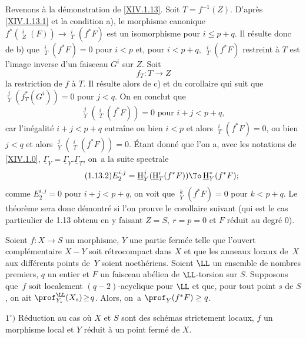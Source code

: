 Revenons \`a la d\'emonstration de \ref{XIV.1.13}. Soit $T=f^{-1}(Z)$. D'apr\`es \ref{XIV.1.13.1} et la condition a), le morphisme canonique $f^*(\mathop{\underline{\mathrm{H}}}\nolimits_Z^i(F))\to\mathop{\underline{\mathrm{H}}}\nolimits_T^i(f^*F)$ est un isomorphisme pour $i\leq p+q$. Il r\'esulte donc de b) que $\mathop{\underline{\mathrm{H}}}\nolimits^i_T(f^*F)=0$ pour $i<p$ et, pour $i<p+q, \ \mathop{\underline{\mathrm{H}}}\nolimits^i_T(f^*F)$ restreint \`a $T$ est l'image inverse d'un faisceau $G^i$ sur $Z$. Soit
$$f_T:T\to Z$$
la restriction de $f$ \`a $T$. Il r\'esulte alors de c) et du corollaire qui suit que $\mathop{\underline{\mathrm{H}}}\nolimits^j_Y(f^*_T(G^i))=0$ pour $j<q$. On en conclut que
$$
\mathop{\underline{\mathrm{H}}}\nolimits^j_Y(\mathop{\underline{\mathrm{H}}}\nolimits^i_T(f^*F))=0\text{ pour } i+j<p+q,
$$
car l'in\'egalit\'e $i+j<p+q$ entra\^ine ou bien $i<p$ et alors $\mathop{\underline{\mathrm{H}}}\nolimits^i_T(f^*F)=0$, ou bien $j<q$ et alors $\mathop{\underline{\mathrm{H}}}\nolimits_Y^j(\mathop{\underline{\mathrm{H}}}\nolimits_T^i(f^*F))=0$. \'Etant donn\'e que l'on a, avec les notations de \ref{XIV.1.0}, $\underline{\Gamma}_Y=\underline{\Gamma}_Y.\underline{\Gamma}_T$, on~a la suite spectrale
\begin{equation*} \label{eq:XIV.1.13.2} \tag{1.13.2}
E_2^{i, j}=\mathop{\underline{\mathrm{H}}}\nolimits_Y^j(\mathop{\underline{\mathrm{H}}}\nolimits_T^i(f^*F))\To\mathop{\underline{\mathrm{H}}}\nolimits^*_Y(f^*F);
\end{equation*}
comme $E_2^{i, j}=0$ pour $i+j<p+q$, on voit que $\mathop{\underline{\mathrm{H}}}\nolimits_Y^k(f^*F)=0$ pour $k<p+q$. Le th\'eor\`eme sera donc d\'emontr\'e si l'on prouve le corollaire suivant (qui est le cas particulier de 1.13 obtenu en y faisant $Z=S, \ r=p=0$ et $F$ r\'eduit au degr\'e $0$).

\begin{corollaire}\label{XIV.1.14}
Soient $f:X\to S$ un morphisme, $Y$ une partie ferm\'ee telle que l'ouvert compl\'ementaire $X- Y$ soit r\'etrocompact dans $X$ et que les anneaux locaux de~$X$ aux diff\'erents points de~$Y$ soient noeth\'eriens. Soient $\LL$ un ensemble de nombres \hbox{premiers}, $q$ un entier et $F$ un faisceau ab\'elien de $\LL$-torsion sur $S$. Supposons que~$f$ soit localement $(q-2)$-acyclique pour $\LL$ et que, pour tout point $s$ de $S$, on ait \hbox{$\prof_{Y_s}^\LL(X_s)\!\geq\! q$}. Alors, on~a $\prof_Y(f^*F)\geq q$.
\end{corollaire}

$1^\circ)$ R\'eduction au cas o\`u $X$ et $S$ sont des sch\'emas strictement locaux, $f$ un morphisme local et $Y$ r\'eduit \`a un point ferm\'e de $X$.


